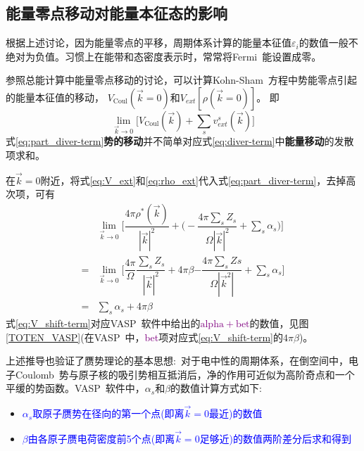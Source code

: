 \subsection{能量零点移动对能量本征态的影响}
根据上述讨论，因为能量零点的平移，周期体系计算的能量本征值$\varepsilon_i$的数值一般不绝对为负值。习惯上在能带和态密度表示时，常常将\textrm{Fermi~}能设置成零。

参照总能计算中能量零点移动的讨论，可以计算\textrm{Kohn-Sham~}方程中势能零点引起的能量本征值的移动，%
$V_{\mathrm{Coul}}(\vec k=0)$和$V_{ext}[\rho(\vec k=0)]$。
即
\begin{equation}
	\lim_{\vec k\rightarrow0}\bigg[V_{\mathrm{Coul}}(\vec k)+\sum_sv_{ext}^s(\vec k)\bigg]
	\label{eq:part_diver-term}
\end{equation}
式\eqref{eq:part_diver-term}\textbf{势的移动}并不简单对应式\eqref{eq:diver-term}中\textbf{能量移动}的发散项求和。

在$\vec k=0$附近，将式\eqref{eq:V_ext}和\eqref{eq:rho_ext}代入式\eqref{eq:part_diver-term}，去掉高次项，可有
\begin{equation}
	\begin{aligned}
		&\lim_{\vec k\rightarrow 0}\bigg[\dfrac{4\pi\rho^{\ast}(\vec k)}{|\vec k|^2}+\bigg(-\dfrac{4\pi\sum_sZ_s}{\Omega|\vec k|^2}+\sum_s\alpha_s\bigg)\bigg]\\
		=&\lim_{\vec k\rightarrow 0}\bigg[\boxed{\dfrac{4\pi}{\Omega}\dfrac{\sum_sZ_s}{|\vec k|^2}}+4\pi\beta\boxed{-\dfrac{4\pi\sum_sZs}{\Omega|\vec k^2|}}+\sum_s\alpha_s\bigg]\\
		=&\sum_s\alpha_s+4\pi\beta
	\end{aligned}
	\label{eq:V_shift-term}
\end{equation}
式\eqref{eq:V_shift-term}对应\textrm{VASP~}软件中给出的\textcolor{purple}{$\mathrm{alpha+bet}$}的数值，见图\ref{TOTEN_VASP}(在\textrm{VASP~}中，\textcolor{purple}{bet}项对应式\eqref{eq:V_shift-term}的$4\pi\beta$)。

上述推导也验证了赝势理论的基本思想:~对于电中性的周期体系，在倒空间中，电子\textrm{Coulomb~}势与原子核的吸引势相互抵消后，净的作用可近似为高阶奇点和一个平缓的势函数。\textrm{VASP~}软件中，$\alpha_s$和$\beta$的数值计算方式如下:~
\begin{itemize}
	\item \textcolor{blue}{$\alpha_s$取原子赝势在径向的第一个点(即离$\vec k=0$最近)的数值}
	\item \textcolor{blue}{$\beta$由各原子赝电荷密度前5个点(即离$\vec k=0$足够近)的数值两阶差分后求和得到}
\end{itemize}

